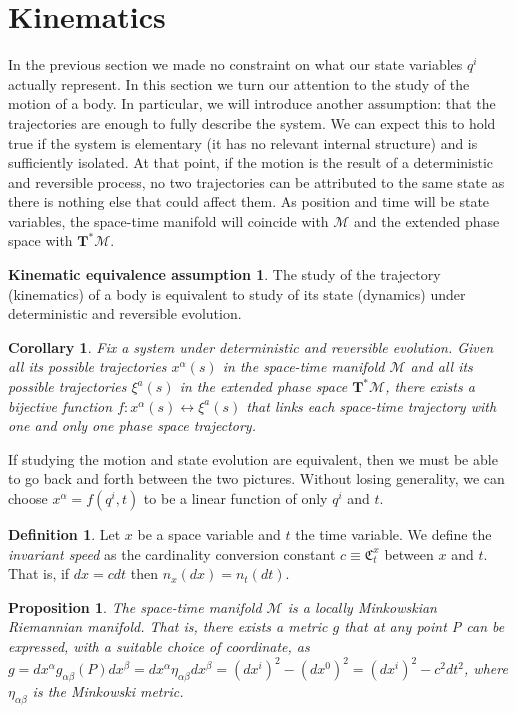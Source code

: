 \documentclass[aps,pra,10pt,twocolumn,floatfix,nofootinbib]{revtex4-1}
\newtheorem{cor}[thm]{Corollary}
\newtheorem{prop}[thm]{Proposition}
\theoremstyle{definition}
\newtheorem{defn}[thm]{Definition}
\newtheorem*{assump3}{Kinematic equivalence assumption}
\begin{document}
\section{Kinematics}
In the previous section we made no constraint on what our state variables $q^i$ actually represent. In this section we turn our attention to the study of the motion of a body. In particular, we will introduce another assumption: that the trajectories are enough to fully describe the system. We can expect this to hold true if the system is elementary (it has no relevant internal structure) and is sufficiently isolated. At that point, if the motion is the result of a deterministic and reversible process, no two trajectories can be attributed to the same state as there is nothing else that could affect them. As position and time will be state variables, the space-time manifold will coincide with $\mathcal{M}$ and the extended phase space with $\mathbf{T}^*\mathcal{M}$.

\begin{assump3}\label{kinematicAssumption}
The study of the trajectory (kinematics) of a body is equivalent to study of its state (dynamics) under deterministic and reversible evolution.
\end{assump3}

\begin{cor}\label{singleTrajectory}
Fix a system under deterministic and reversible evolution. Given all its possible trajectories $x^\alpha(s)$ in the space-time manifold $\mathcal{M}$ and all its possible trajectories $\xi^a(s)$ in the extended phase space $\mathbf{T}^*\mathcal{M}$, there exists a bijective function $f: x^\alpha(s) \leftrightarrow \xi^a(s)$ that links each space-time trajectory with one and only one phase space trajectory.
\end{cor}

If studying the motion and state evolution are equivalent, then we must be able to go back and forth between the two pictures. Without losing generality, we can choose $x^\alpha=f(q^i,t)$ to be a linear function of only $q^i$ and $t$.

\begin{defn}\label{invariantSpeed}
Let $x$ be a space variable and $t$ the time variable. We define the \emph{invariant speed} as the cardinality conversion constant $c \equiv \mathfrak{C}^x_t$ between $x$ and $t$. That is, if $dx=cdt$ then $n_x(dx)=n_t(dt)$.
\end{defn}

\begin{prop}\label{locallyMinkowski}
The space-time manifold $\mathcal{M}$ is a locally Minkowskian Riemannian manifold. That is, there exists a metric $g$ that at any point P can be expressed, with a suitable choice of coordinate, as $g=dx^\alpha g_{\alpha \beta}(P) dx^\beta=dx^\alpha\eta_{\alpha \beta}dx^\beta=(dx^i)^2 - (dx^0)^2=(dx^i)^2 - c^2dt^2$, where $\eta_{\alpha \beta}$ is the Minkowski metric.
\end{prop}
\end{document}
